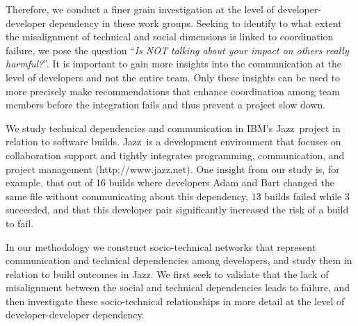 \documentclass{sig-alternate}
\begin{document}
Therefore, we conduct a finer grain investigation at the level of
developer-developer dependency in these work groups. 
Seeking to identify to
what extent the misalignment of technical and social dimensions is linked to coordination failure, we pose the question 
``\emph{Is NOT talking about your impact on others really
harmful?}''. 
It is important to gain more insights into the communication 
at the level of 
developers and not the entire team.
Only %
these insights can be used to more precisely make recommendations that enhance
coordination among team members before the integration fails and thus prevent a project slow down.







We study technical dependencies and communication in IBM's Jazz\texttrademark\
project in relation to software builds. Jazz\texttrademark\ is a development
environment that focuses on collaboration support and tightly integrates
programming, communication, and project management (http://www.jazz.net). One
insight from our study is, for example, that out of 16 builds where developers
Adam and Bart changed the same file without communicating about this dependency,
13 builds failed while 3 succeeded, and that this developer pair significantly increased the risk of a
build to fail.

In our methodology we construct socio-technical networks that
represent communication and technical dependencies among developers, and study
them in relation to build outcomes in Jazz. We first seek to validate that
the lack of misalignment between the social and technical dependencies leads to
failure, and then investigate these socio-technical relationships in more
detail at the level of developer-developer dependency. 
\end{document}
